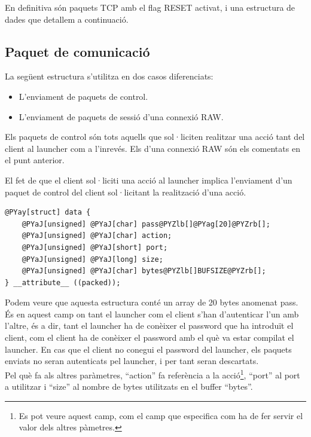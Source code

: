 En definitiva són paquets TCP amb el flag RESET activat, i una estructura de dades que detallem a continuació.

\subsection{Paquet de comunicació} \label{sec:paquet}

La següent estructura s'utilitza en dos casos diferenciats:
\begin{itemize}
    \item L'enviament de paquets de control.
    \item L'enviament de paquets de sessió d'una connexió RAW.
\end{itemize}

Els paquets de control són tots aquells que sol·liciten realitzar una acció tant del client al launcher com a l'inrevés.
Els d'una connexió RAW són els comentats en el punt anterior.

El fet de que el client sol·liciti una acció al launcher implica l'enviament d'un paquet de control del client sol·licitant
la realització d'una acció. 

\begin{Verbatim}[commandchars=@\[\]]
@PYay[struct] data {
    @PYaJ[unsigned] @PYaJ[char] pass@PYZlb[]@PYag[20]@PYZrb[];
    @PYaJ[unsigned] @PYaJ[char] action;
    @PYaJ[unsigned] @PYaJ[short] port;
    @PYaJ[unsigned] @PYaJ[long] size;
    @PYaJ[unsigned] @PYaJ[char] bytes@PYZlb[]BUFSIZE@PYZrb[];
} __attribute__ ((packed));
\end{Verbatim}

Podem veure que aquesta estructura conté un array de 20 bytes anomenat pass. És en aquest camp on tant el launcher
com el client s'han d'autenticar l'un amb l'altre, és a dir, tant el launcher ha de conèixer el password que ha introduït 
el client, com el client ha de conèixer el password amb el què va estar compilat el launcher. En cas que 
el client no conegui el password del launcher, els paquets enviats no seran autenticats pel launcher, i per tant 
seran descartats.\\

Pel què fa als altres paràmetres, ``action'' fa referència a la acció\footnote{Es pot 
veure aquest camp, com el camp que especifica com ha de fer servir el valor dels altres pàmetres.}, ``port'' al port a 
utilitzar i ``size'' al nombre de bytes utilitzats en el buffer ``bytes''.


